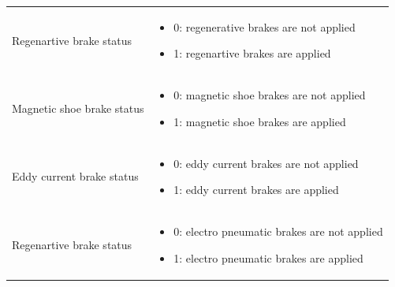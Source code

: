 \documentclass[nocc]{template/openetcs_report}
\begin{document}
\begin{longtable}{|l|l|}
\begin{minipage}[t]{0.5\linewidth}
					\end{minipage} \\
				\hline
				\begin{minipage}[t]{0.5\linewidth} Regenartive brake status	\end{minipage} 
				&	\begin{minipage}[t]{0.5\linewidth}
						\begin{itemize}
							\item 0: regenerative brakes are not applied
							\item 1: regenartive brakes are applied
						\end{itemize}
					\end{minipage} \\
				\hline
				\begin{minipage}[t]{0.5\linewidth} Magnetic shoe brake status	\end{minipage} 
				&	\begin{minipage}[t]{0.5\linewidth}
						\begin{itemize}
							\item 0: magnetic shoe brakes are not applied
							\item 1: magnetic shoe brakes are applied
						\end{itemize}
					\end{minipage} \\
				\hline
				\begin{minipage}[t]{0.5\linewidth} Eddy current brake status	\end{minipage} 
				&	\begin{minipage}[t]{0.5\linewidth}
						\begin{itemize}
							\item 0: eddy current brakes are not applied
							\item 1: eddy current brakes are applied
						\end{itemize}
					\end{minipage} \\
				\hline
				\begin{minipage}[t]{0.5\linewidth} Regenartive brake status	\end{minipage} 
				&	\begin{minipage}[t]{0.5\linewidth}
						\begin{itemize}
							\item 0: electro pneumatic brakes are not applied
							\item 1: electro pneumatic brakes are applied
						\end{itemize}

\end{minipage}
\end{longtable}
\end{document}
